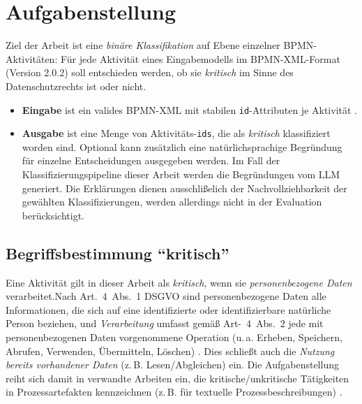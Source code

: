 \section{Aufgabenstellung}\label{sec:aufgabenstellung}

Ziel der Arbeit ist eine \emph{binäre Klassifikation} auf Ebene einzelner \ac{BPMN}-Aktivitäten: Für jede Aktivität eines Eingabemodells im \ac{BPMN}-XML-Format (Version 2.0.2) \cite{omgbpmn} soll entschieden werden, ob sie \emph{kritisch} im Sinne des Datenschutzrechts ist oder nicht.

\begin{itemize}
    \item \textbf{Eingabe} ist ein valides \ac{BPMN}-XML mit stabilen \texttt{id}-Attributen je Aktivität \cite{omgbpmn}.
    \item \textbf{Ausgabe} ist eine Menge von Aktivitäts-\texttt{ids}, die als \emph{kritisch} klassifiziert worden sind. Optional kann zusätzlich eine natürlichsprachige Begründung für einzelne Entscheidungen ausgegeben werden. Im Fall der Klassifizierungspipeline dieser Arbeit werden die Begründungen vom \ac{LLM} generiert. Die Erklärungen dienen ausschlißelich der Nachvollziehbarkeit der gewählten Klassifizierungen, werden allerdings nicht in der Evaluation berücksichtigt.
\end{itemize}

\subsection*{Begriffsbestimmung \enquote{kritisch}}

Eine Aktivität gilt in dieser Arbeit als \emph{kritisch}, wenn sie \emph{personenbezogene Daten} verarbeitet.Nach Art.~4~Abs.~1 \ac{DSGVO} sind personenbezogene Daten alle Informationen, die sich auf eine identifizierte oder identifizierbare natürliche Person beziehen, und \emph{Verarbeitung} umfasst gemäß Art-~4~Abs.~2 jede mit personenbezogenen Daten vorgenommene Operation (u.\,a. Erheben, Speichern, Abrufen, Verwenden, Übermitteln, Löschen) \cite{GDPR2016}. Dies schließt auch die \emph{Nutzung bereits vorhandener Daten} (z.\,B. Lesen/Abgleichen) ein.
Die Aufgabenstellung reiht sich damit in verwandte Arbeiten ein, die kritische/unkritische Tätigkeiten in Prozessartefakten kennzeichnen (z.\,B. für textuelle Prozessbeschreibungen) \cite{nake2023towards}.